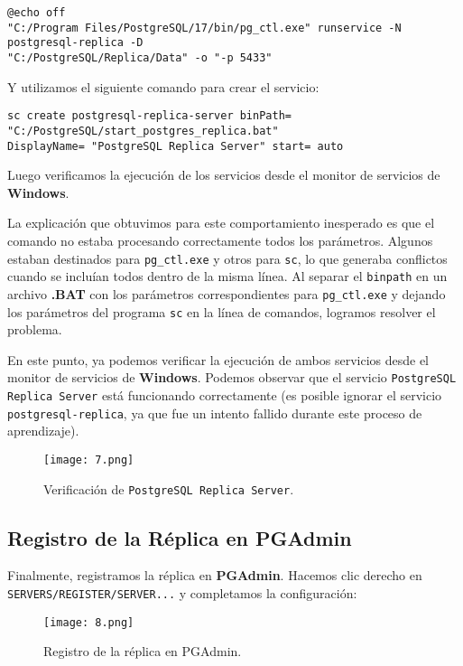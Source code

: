 \documentclass{article}
\begin{document}
\begin{verbatim}
@echo off
"C:/Program Files/PostgreSQL/17/bin/pg_ctl.exe" runservice -N postgresql-replica -D  
"C:/PostgreSQL/Replica/Data" -o "-p 5433"
\end{verbatim}

Y utilizamos el siguiente comando para crear el servicio:

\begin{verbatim}
sc create postgresql-replica-server binPath= "C:/PostgreSQL/start_postgres_replica.bat" 
DisplayName= "PostgreSQL Replica Server" start= auto
\end{verbatim}

\newpage
Luego verificamos la ejecución de los servicios desde el monitor de servicios de \textbf{Windows}.

La explicación que obtuvimos para este comportamiento inesperado es que el comando no estaba procesando correctamente todos los parámetros. Algunos estaban destinados para \texttt{pg\_ctl.exe} y otros para \texttt{sc}, lo que generaba conflictos cuando se incluían todos dentro de la misma línea. Al separar el \texttt{binpath} en un archivo \textbf{.BAT} con los parámetros correspondientes para \texttt{pg\_ctl.exe} y dejando los parámetros del programa \texttt{sc} en la línea de comandos, logramos resolver el problema.

En este punto, ya podemos verificar la ejecución de ambos servicios desde el monitor de servicios de \textbf{Windows}. Podemos observar que el servicio \texttt{PostgreSQL Replica Server} está funcionando correctamente (es posible ignorar el servicio \texttt{postgresql-replica}, ya que fue un intento fallido durante este proceso de aprendizaje).

\begin{figure}[h]
    \centering
    \texttt{[image: 7.png]}
    \caption{Verificación de \texttt{PostgreSQL Replica Server}.}
\end{figure}

\newpage
\subsection{Registro de la Réplica en PGAdmin}

Finalmente, registramos la réplica en \textbf{PGAdmin}. Hacemos clic derecho en \texttt{SERVERS/REGISTER/SERVER...} y completamos la configuración:

\begin{figure}[h]
    \centering
    \texttt{[image: 8.png]}
    \caption{Registro de la réplica en PGAdmin.}
\end{figure}
\end{document}
